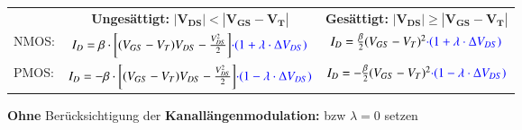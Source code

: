 \resizebox{\columnwidth}{!}
{
    \renewcommand{\arraystretch}{1.5}
    \begin{tabular}{@{}l c | c@{}}
                & \textbf{Ungesättigt:} \quad $\bm{| V_{DS} | < | V_{GS} - V_T |}$                                                              & \textbf{Gesättigt:} \quad $\bm{| V_{DS} | \geq | V_{GS} - V_T |}$                         \\
        NMOS:   & $I_D = \beta \cdot \bigg[ (V_{GS} - V_T) V_{DS} - \frac{V_{DS}^2}{2} \bigg] {\color{blue}\cdot (1 + \lambda \cdot \Delta V_{DS})}$    & $I_D = \frac{\beta}{2} (V_{GS} - V_T)^2 {\color{blue}\cdot (1 + \lambda \cdot \Delta V_{DS})}$    \\
        \midrule
        PMOS:   & $I_D = - \beta \cdot \bigg[ (V_{GS} - V_T) V_{DS} - \frac{V_{DS}^2}{2} \bigg] {\color{blue}\cdot (1 - \lambda \cdot \Delta V_{DS})}$  & $I_{D} = - \frac{\beta}{2} (V_{GS} - V_T)^2 {\color{blue}\cdot (1 - \lambda \cdot \Delta V_{DS})}$
    \end{tabular}
    \renewcommand{\arraystretch}{1}
}

\medskip

\textbf{Ohne} Berücksichtigung der \textbf{Kanallängenmodulation:}  bzw $\lambda = 0$ setzen







